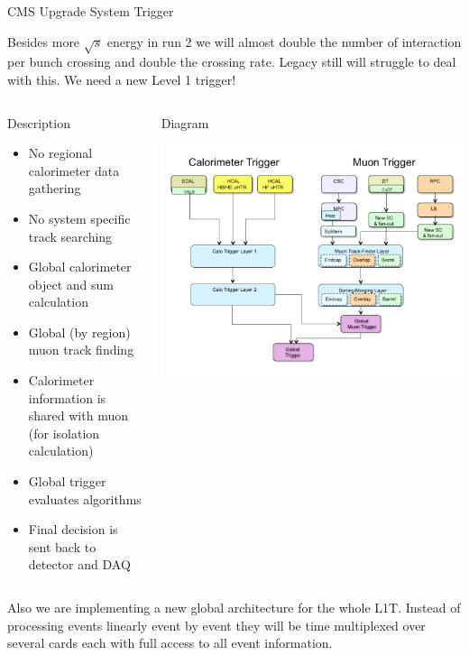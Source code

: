 \documentclass[8pt]{beamer}
\begin{document}
\begin{frame}{CMS Upgrade System Trigger}

Besides more $\sqrt{s}$ energy in run 2 we will almost double the number of interaction per bunch crossing and double the crossing rate. Legacy still will struggle to deal with this. We need a new Level 1 trigger!

\begin{columns}
    
  \column[t]{5.5cm}  
  \begin{block}{Description}
   
  \begin{itemize}
    \item No regional calorimeter data gathering
    \item No system specific track searching
    \item Global calorimeter object and sum calculation
    \item Global (by region) muon track finding
    \item Calorimeter information is shared with muon (for isolation calculation)
    \item Global trigger evaluates algorithms
    \item Final decision is sent back to detector and DAQ
  \end{itemize}

  \end{block}

  \column[t]{5.5cm}
  \begin{block}{Diagram} 
  
    \includegraphics[width=1.00\textwidth]{img/TrigUpgradeBlockDiagram} 
 
  \end{block}

\end{columns}
 
Also we are implementing a new global architecture for the whole L1T. Instead of processing events linearly event by event they will be time multiplexed over several cards each with full access to all event information. 

\end{frame}
\end{document}
